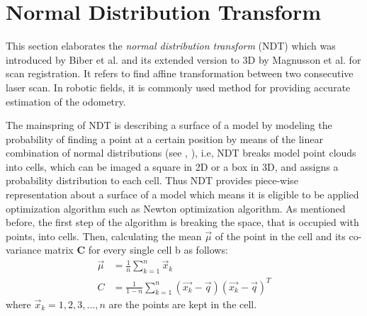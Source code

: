 \section{Normal Distribution Transform}\label{sec:ndt}
This section elaborates the \textit{normal distribution transform} (NDT) which was introduced by Biber et al. \cite{2dndt} and its extended version to 3D by Magnusson et al. \cite{3dndt}  for scan registration. It refers to find affine transformation between two consecutive laser scan. In robotic fields, it is commonly used method for providing accurate estimation of the odometry.%
\\
\par The mainspring of NDT is describing a surface of a model by modeling the probability of finding a point at a certain position by means of the linear combination of normal distributions (see \cite{2dndt}, \cite{3dndt}), i.e, NDT breaks model point clouds into cells, which can be imaged a square in 2D or a box in 3D, and assigns a probability distribution to each cell. Thus NDT provides piece-wise representation about a surface of a model which means it is eligible to be applied optimization algorithm such as Newton optimization algorithm.
As mentioned before, the first step of the algorithm is breaking the space, that is occupied with points, into cells. Then, calculating the mean $\vec \mu$ of the point in the cell  and its co-variance matrix \textbf{C} for every single cell b as follows\cite{2dndt}:
\begin{align}
    \vec \mu &= \frac{1}{n}\sum_{k=1}^n \vec x_k\\
    C &=\frac{1}{1-n}\sum_{k=1}^n(\vec{x_k}-\vec{q})(\vec{x_k} -\vec{q})^T
\end{align}
where $\vec x_k=1,2,3,...,n$ are the points are kept in the cell. \\

